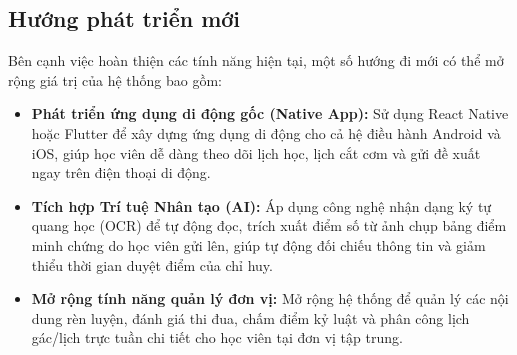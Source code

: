 \documentclass[../DoAn.tex]{subfiles}
\begin{document}
\subsection{Hướng phát triển mới}
Bên cạnh việc hoàn thiện các tính năng hiện tại, một số hướng đi mới có thể mở rộng giá trị của hệ thống bao gồm:
\begin{itemize}
    \item \textbf{Phát triển ứng dụng di động gốc (Native App):} Sử dụng React Native hoặc Flutter để xây dựng ứng dụng di động cho cả hệ điều hành Android và iOS, giúp học viên dễ dàng theo dõi lịch học, lịch cắt cơm và gửi đề xuất ngay trên điện thoại di động.
    \item \textbf{Tích hợp Trí tuệ Nhân tạo (AI):} Áp dụng công nghệ nhận dạng ký tự quang học (OCR) để tự động đọc, trích xuất điểm số từ ảnh chụp bảng điểm minh chứng do học viên gửi lên, giúp tự động đối chiếu thông tin và giảm thiểu thời gian duyệt điểm của chỉ huy.
    \item \textbf{Mở rộng tính năng quản lý đơn vị:} Mở rộng hệ thống để quản lý các nội dung rèn luyện, đánh giá thi đua, chấm điểm kỷ luật và phân công lịch gác/lịch trực tuần chi tiết cho học viên tại đơn vị tập trung.
\end{itemize}
\end{document}
